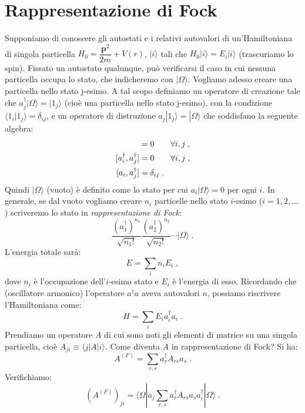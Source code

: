 \documentclass[12pt,a4paper]{report}
\theoremstyle{definition}
\numberwithin{equation}{section}
\newcommand{\bra}{\langle}
\newcommand{\ket}{\rangle}
\newcommand{\adj}[1]{#1^{\dagger}}
\begin{document}
\section{Rappresentazione di Fock}
Supponiamo di conoscere gli autostati e i relativi autovalori di un'Hamiltoniana di singola particella $H_0=\dfrac{\mathbf{p}^2}{2m}+V(r)$, $|i\ket$ tali che $H_0|i\ket=E_i|i\ket$ (trascuriamo lo spin). Fissato un autostato qualunque, può verificarsi il caso in cui nessuna particella occupa lo stato, che indicheremo con $|\Omega\ket$. Vogliamo adesso creare una particella nello stato j-esimo. A tal scopo definiamo un operatore di creazione tale che $\adj{a}_j|\Omega\ket=|1_j\ket$ (cioè una particella nello stato j-esimo), con la condizione $\bra 1_i|1_j\ket=\delta_{ij}$, e un operatore di distruzione $a_j|1_j\ket=|\Omega\ket$ che soddisfano la seguente algebra:
\begin{align}
[a_i,a_j] &= 0 \qquad \forall i,j \notag\;, \\
[\adj{a}_i,\adj{a}_j] &= 0 \qquad \forall i,j \notag\;, \\
[a_i,\adj{a}_j]&=\delta_{ij}\;.
\end{align}
Quindi $|\Omega\ket$ (vuoto) è definito come lo stato per cui $a_i|\Omega\ket=0$ per ogni $i$. In generale, se dal vuoto vogliamo creare $n_i$ particelle nello stato $i$-esimo ($i=1,2,\ldots$) scriveremo lo stato in \textit{rappresentazione di Fock}:
\begin{equation}
\frac{(\adj{a}_1)^{n_1}}{\sqrt{n_1!}}\frac{(\adj{a}_2)^{n_2}}{\sqrt{n_2!}}\cdots|\Omega\ket\;.
\end{equation}
L'energia totale sarà:
\begin{equation}
E=\sum_i n_iE_i\;,
\end{equation}
dove $n_i$ è l'occupazione dell'$i$-esimo stato e $E_i$ è l'energia di esso. Ricordando che (oscillatore armonico) l'operatore $\adj{a}a$ aveva autovalori $n$, possiamo riscrivere l'Hamiltoniana come:
\begin{equation}
H=\sum_i E_i\adj{a}_ia_i\;.
\end{equation}
Prendiamo un operatore $A$ di cui sono noti gli elementi di matrice su una singola particella, cioè $A_{ji}\equiv\bra j|A|i\ket$. Come diventa $A$ in rappresentazione di Fock? Si ha:
\begin{equation}
A^{(F)}=\sum_{r,s}\adj{a}_rA_{rs}a_s\;.
\end{equation}
Verifichiamo:
\begin{equation}
(A^{(F)})_{ji}=\bra\Omega| a_j\sum_{r,s}\adj{a}_rA_{rs}a_s\adj{a}_i|\Omega\ket\;.
\end{equation}
\end{document}
